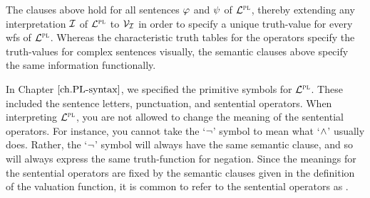 


The clauses above hold for all sentences $\varphi$ and $\psi$ of $\mathcal{L}^{\textsc{pl}}$, thereby extending any interpretation $\mathcal{I}$ of $\mathcal{L}^{\textsc{pl}}$ to $\mathcal{V}_{\mathcal{I}}$ in order to specify a unique truth-value for every wfs of $\mathcal{L}^{\textsc{pl}}$.
Whereas the characteristic truth tables for the operators specify the truth-values for complex sentences visually, the semantic clauses above specify the same information functionally.

In Chapter $\ref{ch.PL-syntax}$, we specified the primitive symbols for $\mathcal{L}^{\textsc{pl}}$.
These included the sentence letters, punctuation, and sentential operators. 
When interpreting $\mathcal{L}^{\textsc{pl}}$, you are not allowed to change the meaning of the sentential operators.
For instance, you cannot take the `$\neg$' symbol to mean what `$\wedge$' usually does.
Rather, the `$\neg$' symbol will always have the same semantic clause, and so will always express the same truth-function for negation.
Since the meanings for the sentential operators are fixed by the semantic clauses given in the definition of the valuation function, it is common to refer to the sentential operators as .

